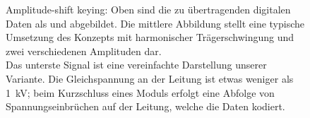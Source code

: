 
\begin{figure}[h!tb]
    \centering
    
    \caption[Amplitude-shift keying]{%
        Amplitude-shift  keying: Oben   sind  die   zu  \"ubertragenden
        digitalen  Daten als   und   abgebildet. Die  mittlere
        Abbildung stellt eine typische Umsetzung des Konzepts mit harmonischer
        Tr\"agerschwingung und zwei verschiedenen Amplituden dar.\protect\\
        Das  unterste   Signal  ist  eine  vereinfachte   Darstellung  unserer
        Variante.  Die  Gleichspannung an  der Leitung  ist etwas  weniger als
        \SI{1}{\kilo\volt}; beim Kurzschluss eines Moduls erfolgt eine Abfolge
        von Spannungseinbr\"uchen auf der Leitung, welche die Daten kodiert.%
    }
    \label{fig:ask:concept}
\end{figure}
